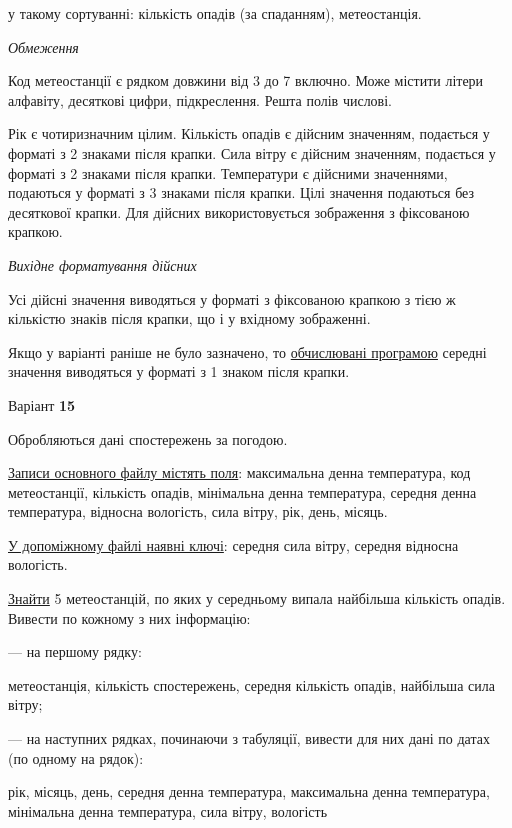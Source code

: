\documentclass[11pt, ukrainian]{article}
\begin{document}
{\noindent}у такому сортуванні: кількість опадів (за спаданням), метеостанція.


\bigskip\textit{Обмеження}

Код метеостанції є рядком довжини від 3 до 7 включно.
Може містити літери алфавіту, десяткові цифри, підкреслення. Решта полів числові.

Рік є чотиризначним цілим.
Кількість опадів є дійсним значенням, подається у форматі з 2 знаками після крапки.
Сила вітру є дійсним значенням, подається у форматі з 2 знаками після крапки.
Температури є дійсними значеннями, подаються у форматі з 3 знаками після крапки.
Цілі значення подаються без десяткової крапки.
Для дійсних використовується зображення з фіксованою крапкою.

\textit{Вихідне форматування дійсних}

Усі дійсні значення виводяться у форматі з фіксованою крапкою з тією ж кількістю знаків після крапки, що і у вхідному зображенні.

Якщо у варіанті раніше не було зазначено, то \underline{обчислювані програмою} середні значення виводяться у форматі з 1 знаком після крапки.


\par
\newpage
{\center Варіант  \No \textbf { 15 }\par}
\bigskip
Обробляються дані спостережень за погодою. 

\underline{Записи основного файлу містять поля}: максимальна денна температура, код метеостанції, кількість опадів, мінімальна денна температура, середня денна температура, відносна вологість, сила вітру, рік, день, місяць.

\underline{У допоміжному файлі наявні ключі}: середня сила вітру, середня відносна вологість.

\underline{Знайти} 5 метеостанцій, по яких у середньому випала найбільша кількість опадів. Вивести по кожному з них інформацію:\par
{\noindent}--- на першому рядку:\par
метеостанція, кількість спостережень, середня кількість опадів, найбільша сила вітру;

{\noindent}--- на наступних рядках, починаючи з табуляції, вивести для них дані по датах (по одному на рядок):\par
рік, місяць, день, середня денна температура, максимальна денна температура, мінімальна денна температура, сила вітру, вологість
\end{document}
